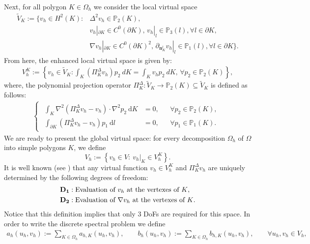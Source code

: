 \documentclass[final,reqno]{elsarticle}
\def\E{K}
\def\O{\Omega}
\def\P{\mathbb{P}}
\def\PiK{\Pi_{K}^{\Delta}}
\def\HdoK{{H^{2}(\E)}}
\newcommand{\dl}{~\textrm{d}l}
\newcommand{\dK}{~\textrm{d}K}
\begin{document}
Next, for all polygon $\E\in \Omega_h$  we consider the local virtual space
\begin{align*}
\widetilde{V}_K
:=\biggl\{v_h\in \HdoK : &\Delta^2 v_h\in\P_{2}(\E),\\
& v_h|_{\partial\E}\in C^0(\partial\E),\,
v_h|_l\in\P_3(l),\forall l\in\partial\E,\\
& \nabla v_h|_{\partial\E}\in C^0(\partial\E)^2,\,
\partial_{\boldsymbol{n}_K^l} v_h|_l\in\P_1(l), \forall l\in\partial\E\biggr\}.
\end{align*}
From here, the enhanced local virtual space is given by:
\begin{align*}
  V_h^K      
:=\left\{v_h\in\widetilde{V}_K : \int_{\E}(\PiK v_h)p_2\ dK=\int_{\E}v_hp_2\ dK,\,\forall p_2\in\P_{2}(\E)\right\},
\end{align*}
where, the polynomial projection operator $\Pi_K^\Delta:\widetilde{V}_K\rightarrow \mathbb{P}_2(K)\subseteq \widetilde{V}_K$ is defined as follows:
\begin{align*}
  \begin{cases}
    \begin{aligned}
      \int_K \nabla^2 (\Pi_{K}^{\Delta} v_h -v_h)\cdot \nabla^2 p_2\dK &= 0, && \forall p_2\in \mathbb{P}_2(K),\\
      \int_{\partial K} (\Pi_{K}^{\Delta} v_h -v_h)p_1 \dl &=0, && \forall p_1\in \mathbb{P}_1(K).
    \end{aligned}
  \end{cases}
\end{align*}
We are ready to present the global virtual space: for every
decomposition $\Omega_h$ of $\O$ into simple polygons $\E$, we define
$$
 V_h  :=\left\{v_h \in  V  :\ v_h|_{\E}\in  V_h^K      \right\}.
$$
%
It is well known (see \cite{BM13}) that any virtual function $v_h\in V_h^{\E}$ and  $\Pi_{\E}^{\Delta}v_h$ 
are uniquely determined by the following degrees of freedom:
\begin{align*}
	&{\bf D_1}: \text{Evaluation of $v_h$ at the vertexes of $\E$}, \\
	&{\bf D_2}: \text{Evaluation of $\nabla v_h$ at the vertexes of $\E$.}
\end{align*}
Notice that this definition implies that only 3 DoFs are required for this space. In order to write the discrete spectral problem we define 
\begin{align*}
a_h(u_h,v_h)
:=\sum_{\E\in\Omega_h}a_{h,\E}(u_h,v_h),
\qquad %
b_h(u_h,v_h)
:=\sum_{\E\in\Omega_h}b_{h,\E}(u_h,v_h),
\qquad \forall u_h,v_h\in V_h  ,
\end{align*}
\end{document}
